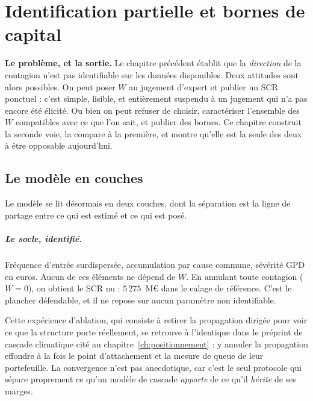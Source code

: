 \chapter{Identification partielle et bornes de capital}
\label{chap:partielle}

\begin{cle}
\textbf{Le problème, et la sortie.} Le chapitre précédent établit que la \emph{direction}
de la contagion n'est pas identifiable sur les données disponibles. Deux attitudes sont
alors possibles. On peut poser $W$ au jugement d'expert et publier un SCR
ponctuel : c'est simple, lisible, et entièrement suspendu à un jugement qui n'a pas encore
été élicité. Ou bien on peut refuser de choisir, caractériser l'ensemble des $W$
compatibles avec ce que l'on sait, et publier des bornes. Ce chapitre construit
la seconde voie, la compare à la première, et montre qu'elle est la seule des deux à être
opposable aujourd'hui.
\end{cle}

\section{Le modèle en couches}

Le modèle se lit désormais en deux couches, dont la séparation est la ligne de partage
entre ce qui est estimé et ce qui est posé.

\paragraph{Le socle, identifié.} Fréquence d'entrée surdispersée, accumulation par cause
commune, sévérité GPD en euros. Aucun de ces éléments ne dépend de $W$. En annulant toute
contagion ($W = 0$), on obtient le SCR nu : $5\,275$~M\euro{} dans le calage de
référence. C'est le plancher défendable, et il ne repose sur aucun paramètre non
identifiable.

Cette expérience d'ablation, qui consiste à retirer la propagation dirigée pour voir ce que la
structure porte réellement, se retrouve à l'identique dans le préprint de cascade climatique cité
au chapitre~\ref{ch:positionnement} \citep{ccrn2026} : y annuler la propagation effondre à la fois le
point d'attachement et la mesure de queue de leur portefeuille. La convergence n'est pas
anecdotique, car c'est le seul protocole qui sépare proprement ce qu'un modèle de cascade
\emph{apporte} de ce qu'il \emph{hérite} de ses marges.


